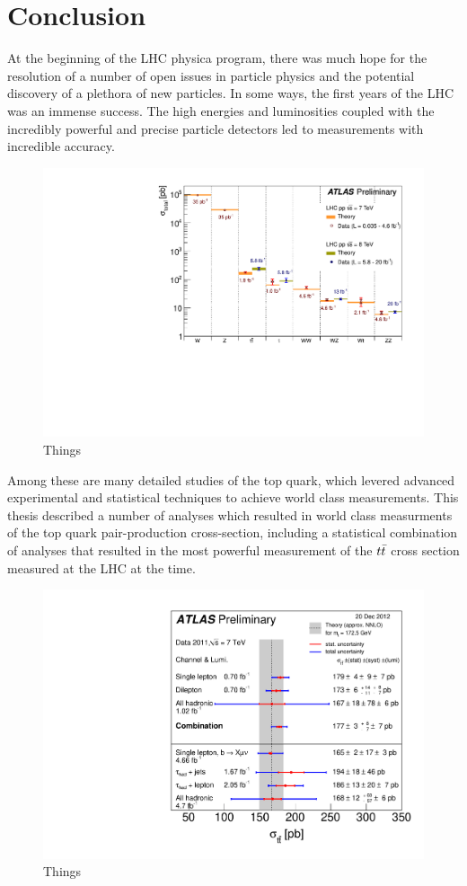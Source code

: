 

\chapter{Conclusion}

At the beginning of the LHC physica program, there was much hope for the
resolution of a number of open issues in particle physics and the potential
discovery of a plethora of new particles.
In some ways, the first years of the LHC was an immense success.
The high energies and luminosities coupled with the incredibly powerful
and precise particle detectors led to measurements with incredible
accuracy.

\begin{figure}[ht!]
  \begin{center}
    \includegraphics[width=.75\textwidth]{figures/conclusion/SM_SummaryPlotMoriondEWK2013}
    \caption{Things}
    \label{fig:xsec_vs_roots}
  \end{center}
\end{figure}


Among these are many detailed studies of the top quark, which levered
advanced experimental and statistical techniques to achieve world class measurements.
This thesis described a number of analyses which resulted in world class measurments
of the top quark pair-production cross-section, including a statistical combination
of analyses that resulted in the most powerful measurement of the $t\bar{t}$ cross
section measured at the LHC at the time.

\begin{figure}[ht!]
  \begin{center}
    \includegraphics[width=.75\textwidth]{figures/conclusion/tt_xsec20Dec2012}
    \caption{Things}
    \label{fig:xsec_vs_roots}
  \end{center}
\end{figure}
\clearpage

